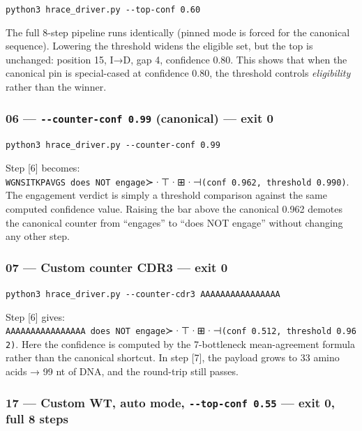\texttt{python3\ hrace\_driver.py\ -\/-top-conf\ 0.60}

The full 8-step pipeline runs identically (pinned mode is forced for the
canonical sequence). Lowering the threshold widens the eligible set, but
the top is unchanged: position 15, I→D, gap 4, confidence 0.80. This
shows that when the canonical pin is special-cased at confidence 0.80,
the threshold controls \emph{eligibility} rather than the winner.

\hypertarget{counter-conf-0.99-canonical-exit-0}{%
\subsubsection{\texorpdfstring{06 --- \texttt{-\/-counter-conf\ 0.99}
(canonical) --- exit
0}{06 --- -\/-counter-conf 0.99 (canonical) --- exit 0}}\label{counter-conf-0.99-canonical-exit-0}}

\texttt{python3\ hrace\_driver.py\ -\/-counter-conf\ 0.99}

Step {[}6{]} becomes:
\texttt{WGNSITKPAVGS\ does\ NOT\ engage}≻·⊤·⊞·⊣\texttt{(conf\ 0.962,\ threshold\ 0.990)}.
The engagement verdict is simply a threshold comparison against the same
computed confidence value. Raising the bar above the canonical 0.962
demotes the canonical counter from ``engages'' to ``does NOT engage''
without changing any other step.

\hypertarget{custom-counter-cdr3-exit-0}{%
\subsubsection{07 --- Custom counter CDR3 --- exit
0}\label{custom-counter-cdr3-exit-0}}

\texttt{python3\ hrace\_driver.py\ -\/-counter-cdr3\ AAAAAAAAAAAAAAAA}

Step {[}6{]} gives:
\texttt{AAAAAAAAAAAAAAAA\ does\ NOT\ engage}≻·⊤·⊞·⊣\texttt{(conf\ 0.512,\ threshold\ 0.962)}.
Here the confidence is computed by the 7-bottleneck mean-agreement
formula rather than the canonical shortcut. In step {[}7{]}, the payload
grows to 33 amino acids → 99 nt of DNA, and the round-trip still passes.

\hypertarget{custom-wt-auto-mode---top-conf-0.55-exit-0-full-8-steps}{%
\subsubsection{\texorpdfstring{17 --- Custom WT, auto mode,
\texttt{-\/-top-conf\ 0.55} --- exit 0, full 8
steps}{17 --- Custom WT, auto mode, -\/-top-conf 0.55 --- exit 0, full 8 steps}}\label{custom-wt-auto-mode---top-conf-0.55-exit-0-full-8-steps}}

